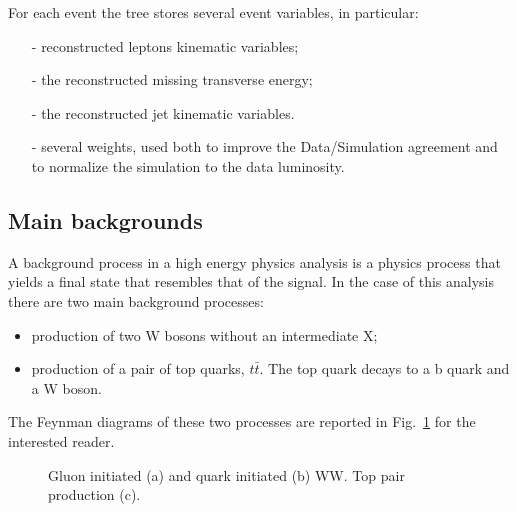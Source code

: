 \documentclass[a4paper,12pt]{article}
\begin{document}
For each event the tree stores several event variables, in particular:
\begin{itemize}
\item[-] reconstructed leptons kinematic variables;
\item[-] the reconstructed missing transverse energy;
\item[-] the reconstructed jet kinematic variables.
\item[-] several weights, used both to improve the Data/Simulation agreement
and to normalize the simulation to the data luminosity.
\end{itemize}

\subsection{Main backgrounds}
A background process in a high energy physics analysis is a physics process
that yields a final state that resembles that of the signal.
In the case of this analysis there are two main background processes:
\begin{itemize}
\item production of two W bosons without an intermediate X;
\item production of a pair of top quarks, $t\bar{t}$. The top quark decays to
a b quark and a W boson.
\end{itemize}
The Feynman diagrams of these two processes are reported in
Fig.~\ref{fig:backgrounds} for the interested reader.

\begin{figure}
\centering
{}
\caption{Gluon initiated (a) and quark initiated (b) WW. Top pair production
(c).\label{fig:backgrounds}}
\end{figure}
\end{document}
